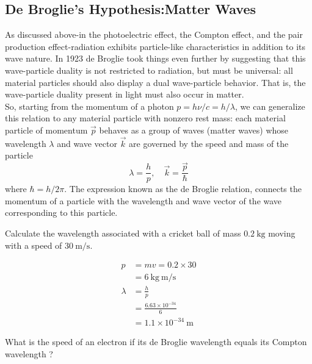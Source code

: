 \subsection{De Broglie's Hypothesis:Matter Waves}
As discussed above-in the photoelectric effect, the Compton effect, and the pair production effect-radiation exhibits particle-like characteristics in addition to its wave nature. In 1923 de Broglie took things even further by suggesting that this wave-particle duality is not restricted to radiation, but must be universal: all material particles should also display a dual wave-particle behavior. That is, the wave-particle duality present in light must also occur in matter.\\
So, starting from the momentum of a photon $p=h \nu / c=h / \lambda$, we can generalize this relation to any material particle  with nonzero rest mass: each material particle of momentum $\vec{p}$ behaves as a group of waves (matter waves) whose wavelength $\lambda$ and wave vector $\vec{k}$ are governed by the speed and mass of the particle\\
$$\lambda=\frac{h}{p}, \quad \vec{k}=\frac{\vec{p}}{\hbar}$$
where $\hbar=h / 2 \pi$. The expression known as the de Broglie relation, connects the momentum of a particle with the wavelength and wave vector of the wave corresponding to this particle.\\
\begin{exercise}
	Calculate the wavelength associated with a cricket ball of mass $0.2 \mathrm{~kg}$ moving with a speed of $30 \mathrm{~m} / \mathrm{s}$.
\end{exercise}
\begin{answer}
	\begin{align*}
	p&=m v=0.2 \times 30\\&=6 \mathrm{~kg} \mathrm{~m} / \mathrm{s} \\
	\lambda&=\frac{h}{p}\\&=\frac{6.63 \times 10^{-34}}{6}\\&=1.1 \times 10^{-34} \mathrm{~m}
	\end{align*}
\end{answer}
\begin{exercise}
	What is the speed of an electron if its de Broglie wavelength equals its Compton wavelength ?
\end{exercise}

